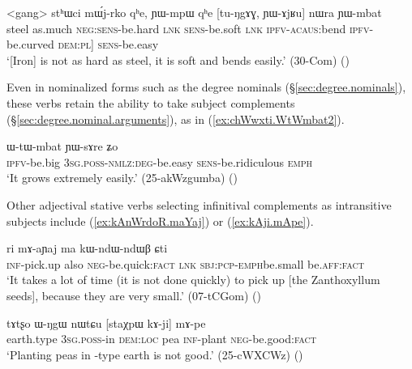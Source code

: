 \begin{exe}
\ex \label{ex:YAjRu.YWmbat}
\gll <gang> stʰɯci mɯ́j-rko qʰe, ɲɯ-mpɯ qʰe [tu-ŋgɤɣ, ɲɯ-ɤjʁu] nɯra ɲɯ-mbat \\
steel as.much \textsc{neg}:\textsc{sens}-be.hard \textsc{lnk} \textsc{sens}-be.soft \textsc{lnk} \textsc{ipfv}-\textsc{acaus}:bend \textsc{ipfv}-be.curved  \textsc{dem}:\textsc{pl}] \textsc{sens}-be.easy \\
\glt `[Iron] is not as hard as steel, it is soft and bends easily.' (30-Com)
()
\end{exe}

Even in nominalized forms such as the degree nominals (§\ref{sec:degree.nominals}), these verbs retain the ability to take subject complements (§\ref{sec:degree.nominal.arguments}), as in (\ref{ex:chWwxti.WtWmbat2}).

\begin{exe}
\ex \label{ex:chWwxti.WtWmbat2}
 ɯ-tɯ-mbat ɲɯ-sɤre ʑo  \\
\textsc{ipfv}-be.big \textsc{3sg}.\textsc{poss}-\textsc{nmlz}:\textsc{deg}-be.easy \textsc{sens}-be.ridiculous \textsc{emph} \\
\glt `It grows extremely easily.' (25-akWzgumba)
()
\end{exe}

Other adjectival stative verbs selecting infinitival complements as intransitive subjects include  (\ref{ex:kAnWrdoR.maYaj}) or  (\ref{ex:kAji.mApe}).

\begin{exe}
\ex \label{ex:kAnWrdoR.maYaj}
\gll [kɤ-nɯrdoʁ] ri mɤ-aɲaj ma kɯ-ndɯ-ndɯβ ɕti \\
\textsc{inf}-pick.up also \textsc{neg}-be.quick:\textsc{fact} \textsc{lnk} \textsc{sbj}:\textsc{pcp}-\textsc{emph}\redp{}be.small be.\textsc{aff}:\textsc{fact} \\
\glt `It takes a lot of time (it is not done quickly) to pick up [the Zanthoxyllum seeds], because they are very small.' (07-tCGom)
()
\end{exe}

 \begin{exe}
\ex \label{ex:kAji.mApe}
\gll tɤtʂo ɯ-ŋgɯ nɯtɕu [staχpɯ kɤ-ji] mɤ-pe \\
earth.type \textsc{3sg}.\textsc{poss}-in \textsc{dem}:\textsc{loc} pea \textsc{inf}-plant \textsc{neg}-be.good:\textsc{fact} \\
\glt `Planting peas in -type earth is not good.' (25-cWXCWz)
()
\end{exe}


